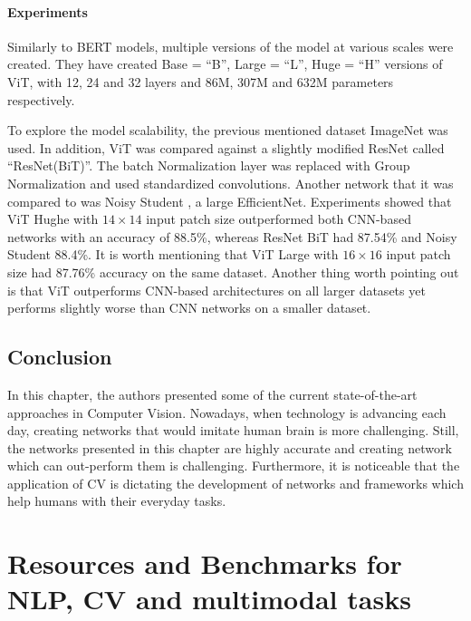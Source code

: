 \documentclass[
]{krantz}
\begin{document}
\hypertarget{experiments}{%
\paragraph{Experiments}\label{experiments}}

Similarly to BERT models, multiple versions of the model at various scales were created. They have created Base = ``B'', Large = ``L'', Huge = ``H'' versions of ViT, with 12, 24 and 32 layers and 86M, 307M and 632M parameters respectively.

To explore the model scalability, the previous mentioned dataset ImageNet was used. In addition, ViT was compared against a slightly modified ResNet called ``ResNet(BiT)''. The batch Normalization layer was replaced with Group Normalization and used standardized convolutions. Another network that it was compared to was Noisy Student \citep{noisy}, a large EfficientNet. Experiments showed that ViT Hughe with \(14\times 14\) input patch size outperformed both CNN-based networks with an accuracy of 88.5\%, whereas ResNet BiT had 87.54\% and Noisy Student 88.4\%. It is worth mentioning that ViT Large with \(16\times 16\) input patch size had 87.76\% accuracy on the same dataset.
Another thing worth pointing out is that ViT outperforms CNN-based architectures on all larger datasets yet performs slightly worse than CNN networks on a smaller dataset.

\hypertarget{conclusion}{%
\subsection{Conclusion}\label{conclusion}}

In this chapter, the authors presented some of the current state-of-the-art approaches in Computer Vision. Nowadays, when technology is advancing each day, creating networks that would imitate human brain is more challenging. Still, the networks presented in this chapter are highly accurate and creating network which can out-perform them is challenging. Furthermore, it is noticeable that the application of CV is dictating the development of networks and frameworks which help humans with their everyday tasks.

\hypertarget{c01-03-benchmarks}{%
\section{Resources and Benchmarks for NLP, CV and multimodal tasks}\label{c01-03-benchmarks}}
\end{document}
